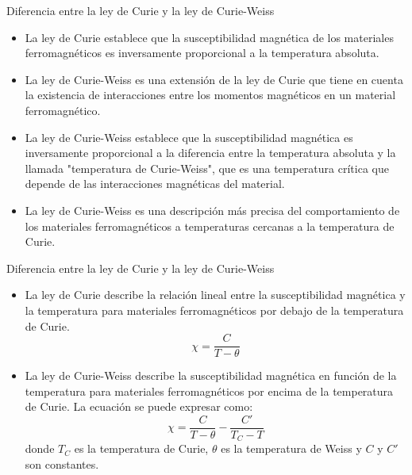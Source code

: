 \documentclass{beamer}
\begin{document}
\begin{frame}{Diferencia entre la ley de Curie y la ley de Curie-Weiss}
    \begin{itemize}
        \item La ley de Curie establece que la susceptibilidad magnética de los materiales ferromagnéticos es inversamente proporcional a la temperatura absoluta.
        \item La ley de Curie-Weiss es una extensión de la ley de Curie que tiene en cuenta la existencia de interacciones entre los momentos magnéticos en un material ferromagnético.
        \item La ley de Curie-Weiss establece que la susceptibilidad magnética es inversamente proporcional a la diferencia entre la temperatura absoluta y la llamada "temperatura de Curie-Weiss", que es una temperatura crítica que depende de las interacciones magnéticas del material.
        \item La ley de Curie-Weiss es una descripción más precisa del comportamiento de los materiales ferromagnéticos a temperaturas cercanas a la temperatura de Curie.
    \end{itemize}
\end{frame}

\begin{frame}{Diferencia entre la ley de Curie y la ley de Curie-Weiss}
    \begin{itemize}
        \item La ley de Curie describe la relación lineal entre la susceptibilidad magnética y la temperatura para materiales ferromagnéticos por debajo de la temperatura de Curie.
        \begin{equation*}
            \chi = \frac{C}{T - \theta}
        \end{equation*}
        \item La ley de Curie-Weiss describe la susceptibilidad magnética en función de la temperatura para materiales ferromagnéticos por encima de la temperatura de Curie. La ecuación se puede expresar como:
        \begin{equation*}
            \chi = \frac{C}{T - \theta} - \frac{C'}{T_C - T}
        \end{equation*}
        donde $T_C$ es la temperatura de Curie, $\theta$ es la temperatura de Weiss y $C$ y $C'$ son constantes.
    \end{itemize}
\end{frame}
\end{document}

